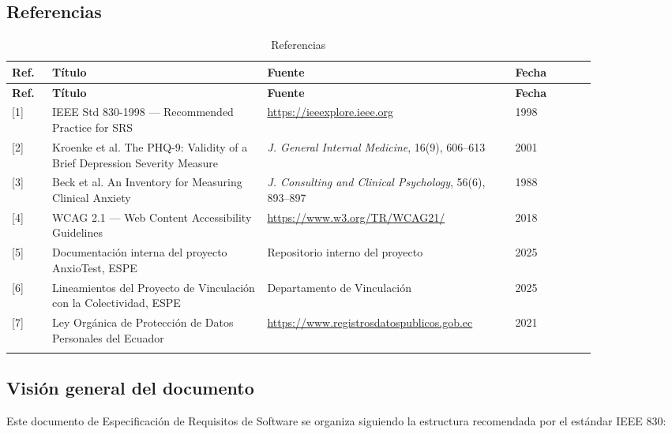 \subsection{Referencias}
\label{sec:referencias}

\begin{longtable}{p{0.06\linewidth} p{0.32\linewidth} p{0.36\linewidth} p{0.12\linewidth}}
\toprule
\rowcolor{tableheader!20}
\textbf{Ref.} & \textbf{Título} & \textbf{Fuente} & \textbf{Fecha} \\
\midrule
\endfirsthead
\rowcolor{tableheader!20}
\textbf{Ref.} & \textbf{Título} & \textbf{Fuente} & \textbf{Fecha} \\
\midrule
\endhead
\bottomrule
\endfoot
{[1]} & IEEE Std 830-1998 --- Recommended Practice for SRS & \url{https://ieeexplore.ieee.org} & 1998 \\
{[2]} & Kroenke et al. The PHQ-9: Validity of a Brief Depression Severity Measure & \textit{J. General Internal Medicine}, 16(9), 606--613 & 2001 \\
{[3]} & Beck et al. An Inventory for Measuring Clinical Anxiety & \textit{J. Consulting and Clinical Psychology}, 56(6), 893--897 & 1988 \\
{[4]} & WCAG 2.1 --- Web Content Accessibility Guidelines & \url{https://www.w3.org/TR/WCAG21/} & 2018 \\
{[5]} & Documentación interna del proyecto AnxioTest, ESPE & Repositorio interno del proyecto & 2025 \\
{[6]} & Lineamientos del Proyecto de Vinculación con la Colectividad, ESPE & Departamento de Vinculación & 2025 \\
{[7]} & Ley Orgánica de Protección de Datos Personales del Ecuador & \url{https://www.registrosdatospublicos.gob.ec} & 2021 \\
\bottomrule
\caption{Referencias}
\label{tab:referencias}
\end{longtable}

\subsection{Visión general del documento}
\label{sec:vision_general}

Este documento de Especificación de Requisitos de Software se organiza siguiendo la estructura recomendada por el estándar IEEE 830:


